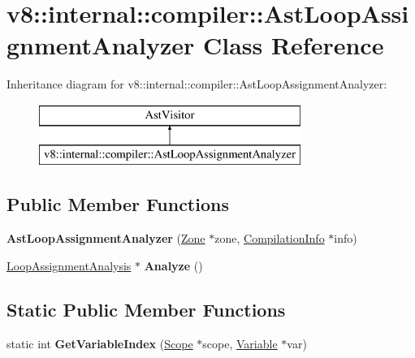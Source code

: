 \hypertarget{classv8_1_1internal_1_1compiler_1_1_ast_loop_assignment_analyzer}{}\section{v8\+:\+:internal\+:\+:compiler\+:\+:Ast\+Loop\+Assignment\+Analyzer Class Reference}
\label{classv8_1_1internal_1_1compiler_1_1_ast_loop_assignment_analyzer}
Inheritance diagram for v8\+:\+:internal\+:\+:compiler\+:\+:Ast\+Loop\+Assignment\+Analyzer\+:\begin{figure}[H]
\begin{center}
\leavevmode
\includegraphics[height=2.000000cm]{classv8_1_1internal_1_1compiler_1_1_ast_loop_assignment_analyzer}
\end{center}
\end{figure}
\subsection*{Public Member Functions}
\begin{DoxyCompactItemize}
\item 
{\bfseries Ast\+Loop\+Assignment\+Analyzer} (\hyperlink{classv8_1_1internal_1_1_zone}{Zone} $\ast$zone, \hyperlink{classv8_1_1internal_1_1_compilation_info}{Compilation\+Info} $\ast$info)\hypertarget{classv8_1_1internal_1_1compiler_1_1_ast_loop_assignment_analyzer_ac8f42bcc7e07a704b14224eca06f83a4}{}\label{classv8_1_1internal_1_1compiler_1_1_ast_loop_assignment_analyzer_ac8f42bcc7e07a704b14224eca06f83a4}

\item 
\hyperlink{classv8_1_1internal_1_1compiler_1_1_loop_assignment_analysis}{Loop\+Assignment\+Analysis} $\ast$ {\bfseries Analyze} ()\hypertarget{classv8_1_1internal_1_1compiler_1_1_ast_loop_assignment_analyzer_aac73fbdf386cb9a7f192005a69a77159}{}\label{classv8_1_1internal_1_1compiler_1_1_ast_loop_assignment_analyzer_aac73fbdf386cb9a7f192005a69a77159}

\end{DoxyCompactItemize}
\subsection*{Static Public Member Functions}
\begin{DoxyCompactItemize}
\item 
static int {\bfseries Get\+Variable\+Index} (\hyperlink{classv8_1_1internal_1_1_scope}{Scope} $\ast$scope, \hyperlink{classv8_1_1internal_1_1_variable}{Variable} $\ast$var)\hypertarget{classv8_1_1internal_1_1compiler_1_1_ast_loop_assignment_analyzer_a49e97756b563ecbf37779d1f48f86b42}{}\label{classv8_1_1internal_1_1compiler_1_1_ast_loop_assignment_analyzer_a49e97756b563ecbf37779d1f48f86b42}

\end{DoxyCompactItemize}
